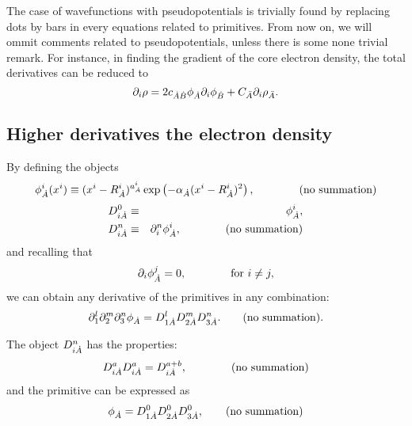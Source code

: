The case of wavefunctions with pseudopotentials is trivially found by replacing 
dots by bars in every equations related to primitives. From now on, we will ommit
comments related to pseudopotentials, unless there is some none trivial remark.
For instance, in finding the gradient of the core electron density, the total
derivatives can be reduced to
%
\begin{equation}%
   \partial_i\rho=2c_{\dA\dB}\phi_{\dA}\partial_i\phi_{\dB}
   +C_{\bA}\partial_i\rho_{\bA}.
\end{equation}
%


\subsection{Higher derivatives the electron density}

By defining the objects
%
\begin{equation}
   \phi^i_{\dot{A}}(x^i)\equiv(x^i-R^i_{\dot{A}})^{a^i_{\dot{A}}}\exp\left(-\alpha_{\dot{A}}(x^i-R^i_{\dot{A}})^2\right),
   \qquad\qquad\textrm{(no summation)}
\end{equation}
%
%
\begin{eqnarray}
  D_{i\dot{A}}^0&\equiv&\phi^i_{\dot{A}},\nonumber\\
   D_{i\dot{A}}^n&\equiv&\partial_i^n\phi^i_{\dot{A}},\qquad\qquad\textrm{(no summation)}
\end{eqnarray}
%
and recalling that
%
\begin{equation}
   \partial_i\phi^j_{\dot{A}}=0,\qquad\qquad\textrm{for }i\neq j,
\end{equation}
%
we can obtain any derivative of the primitives in any combination:
%
\begin{equation}
  \partial_1^l\partial_2^m\partial_3^n\phi_{\dot{A}}=D_{1\dot{A}}^lD_{2\dot{A}}^mD_{3\dot{A}}^n.
  \qquad\textrm{(no summation)}.
\end{equation}
%

The object $D_{i\dot{A}}^n$ has the properties:
%
\begin{equation}
  D^a_{i\dot{A}}D^a_{i\dot{A}}=D^{a+b}_{i\dot{A}},\qquad\qquad\textrm{(no summation)}
\end{equation}
%
and the primitive can be expressed as
%
\begin{equation}%
  \phi_{\dA}=D^0_{1\dA}D^0_{2\dA}D^0_{3\dA}, \qquad\textrm{(no summation)}
\end{equation}
%


